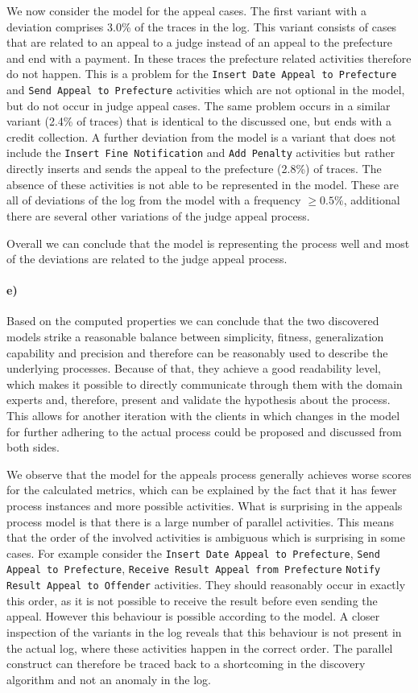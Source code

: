 \documentclass[12pt]{report}
\begin{document}
We now consider the model for the appeal cases. The first variant with a deviation comprises 3.0\% of the traces in the log. This variant consists of cases that are related to an appeal to a judge instead of an appeal to the prefecture and end with a payment. In these traces the prefecture related activities therefore do not happen. This is a problem for the \texttt{Insert Date Appeal to Prefecture} and \texttt{Send Appeal to Prefecture} activities which are not optional in the model, but do not occur in judge appeal cases. The same problem occurs in a similar variant (2.4\% of traces) that is identical to the discussed one, but ends with a credit collection.
A further deviation from the model is a variant that does not include the \texttt{Insert Fine Notification} and \texttt{Add Penalty} activities but rather directly inserts and sends the appeal to the prefecture (2.8\%) of traces. The absence of these activities is not able to be represented in the model.
These are all of deviations of the log from the model with a frequency $\geq 0.5\%$, additional there are several other variations of the judge appeal process. 

Overall we can conclude that the model is representing the process well and most of the deviations are related to the judge appeal process.

\paragraph{\textbf{e)}}

Based on the computed properties we can conclude that the two discovered models strike a reasonable balance between simplicity, fitness, generalization capability and precision and therefore can be reasonably used to describe the underlying processes. Because of that, they achieve a good readability level, which makes it possible to directly communicate through them with the domain experts and, therefore, present and validate the hypothesis about the process. This allows for another iteration with the clients in which changes in the model for further adhering to the actual process could be proposed and discussed from both sides.

We observe that the model for the appeals process generally achieves worse scores for the calculated metrics, which can be explained by the fact that it has fewer process instances and more possible activities. What is surprising in the appeals process model is that there is a large number of parallel activities. This means that the order of the involved activities is ambiguous which is surprising in some cases. For example consider the \texttt{Insert Date Appeal to Prefecture}, \texttt{Send Appeal to Prefecture}, \texttt{Receive Result Appeal from Prefecture} \texttt{Notify Result Appeal to Offender} activities. They should reasonably occur in exactly this order, as it is not possible to receive the result before even sending the appeal. However this behaviour is possible according to the model. A closer inspection of the variants in the log reveals that this behaviour is not present in the actual log, where these activities happen in the correct order. The parallel construct can therefore be traced back to a shortcoming in the discovery algorithm and not an anomaly in the log.
\end{document}
